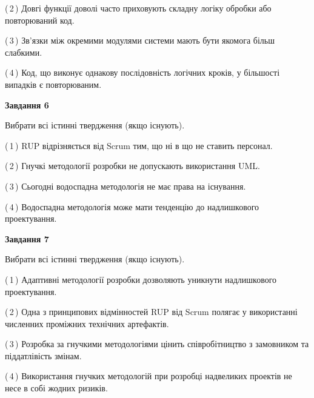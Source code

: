 \documentclass[10pt, ukrainian]{article}
\begin{document}
{\begin {large}
(\,2\,) Довгі функції доволі часто приховують складну логіку обробки або повторюваний код. %



(\,3\,) Зв'язки між окремими модулями системи мають бути якомога більш слабкими. %



(\,4\,) Код, що виконує однакову послідовність логічних кроків, у більшості випадків є повторюваним.%

\newpage

{\begin {center}\textbf{Завдання 6}\end {center}}\par
Вибрати всі істинні твердження (якщо існують).\par
\vspace{2mm}



(\,1\,) RUP відрізняється від Scrum тим, що ні в що не ставить персонал.%



(\,2\,) Гнучкі методології розробки не допускають використання UML. %



(\,3\,) Сьогодні водоспадна методологія не має права на існування. %



(\,4\,) Водоспадна методологія може мати тенденцію до надлишкового проектування. %


{\begin {center}\textbf{Завдання 7}\end {center}}\par
Вибрати всі істинні твердження (якщо існують).\par
\vspace{2mm}



(\,1\,) Адаптивні методології розробки дозволяють уникнути надлишкового проектування. %



(\,2\,) Одна з принципових відмінностей RUP від Scrum полягає у використанні численних проміжних технічних артефактів. %



(\,3\,) Розробка за гнучкими методологіями цінить співробітництво з замовником та піддатлівість змінам. %



(\,4\,) Використання гнучких методологій при розробці надвеликих проектів не несе в собі жодних ризиків. %



\end{large}}
\end{document}
